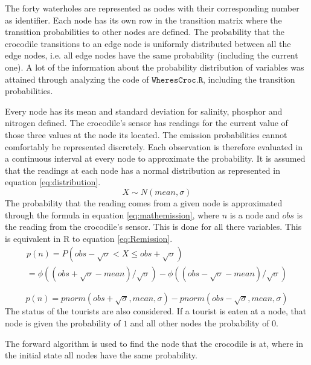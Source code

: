 \documentclass[12pt, a4paper]{article}
\begin{document}
The forty waterholes are represented as nodes with their corresponding number as identifier. Each node has its own row in the transition matrix where the transition probabilities to other nodes are defined. The probability that the crocodile transitions to an edge node is uniformly distributed between all the edge nodes, i.e. all edge nodes have the same probability (including the current one). A lot of the information about the probability distribution of variables was attained through analyzing the code of $ \mathtt{WheresCroc.R}$, including the transition probabilities.

Every node has its mean and standard deviation for salinity, phosphor and nitrogen defined. The crocodile's sensor has readings for the current value of those three values at the node its located. The emission probabilities cannot comfortably be represented discretely. Each observation is therefore evaluated in a continuous interval at every node to approximate the probability. It is assumed that the readings at each node has a normal distribution as represented in equation \ref{eq:distribution}.
\begin{equation}\label{eq:distribution}
X \sim N(mean,\sigma)
\end{equation}
The probability that the reading comes from a given node is approximated through the formula in equation \ref{eq:mathemission}, where $n$ is a node and $obs$ is the reading from the crocodile's sensor. This is done for all there variables. This is equivalent in R to equation \ref{eq:Remission}.
\begin{equation}\label{eq:mathemission}
\begin{split}
p(n) = P(obs-\sqrt{\sigma} < X \le obs+\sqrt{\sigma}) \hspace{137pt}
\\
=\phi((obs+\sqrt{\sigma}-mean)/\sqrt{\sigma})-\phi((obs-\sqrt{\sigma}-mean)/\sqrt{\sigma})
\end{split}
\end{equation}

\begin{equation}\label{eq:Remission}
p(n) = pnorm(obs+\sqrt{\sigma},mean,\sigma)-pnorm(obs-\sqrt{\sigma},mean,\sigma)
\end{equation}
The status of the tourists are also considered. If a tourist is eaten at a node, that node is given the probability of $1$ and all other nodes the probability of $0$.

The forward algorithm is used to find the node that the crocodile is at, where in the initial state all nodes have the same probability.
\end{document}
